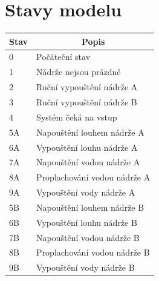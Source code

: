 \documentclass[12pt]{report}
\begin{document}
	\section{Stavy modelu}
	\begin{table}[]
		\begin{tabular}{ll}
			\hline
			\multicolumn{1}{c}{Stav} 	 & \multicolumn{1}{c}{Popis}      \\ \hline
			0                            & Počáteční stav				  \\
			1                            & Nádrže nejsou prázdné          \\
			2                            & Ruční vypouštění nádrže A   	  \\ 
			3                            & Ruční vypouštění nádrže B   	  \\ 
			4                            & Systém čeká na vstup 		  \\ \hline
			5A                           & Napouštění louhem nádrže A     \\
			6A                           & Vypouštění louhu nádrže A      \\
			7A                           & Napouštění vodou nádrže A      \\
			8A                           & Proplachování vodou nádrže A   \\
			9A                           & Vypouštění vody nádrže A       \\ \hline
			5B                           & Napouštění louhem nádrže B     \\
			6B                           & Vypouštění louhu nádrže B      \\
			7B                           & Napouštění vodou nádrže B      \\
			8B                           & Proplachování vodou nádrže B   \\
			9B                           & Vypouštění vody nádrže B       \\ \hline
		\end{tabular}
	\end{table}
	
\end{document}
